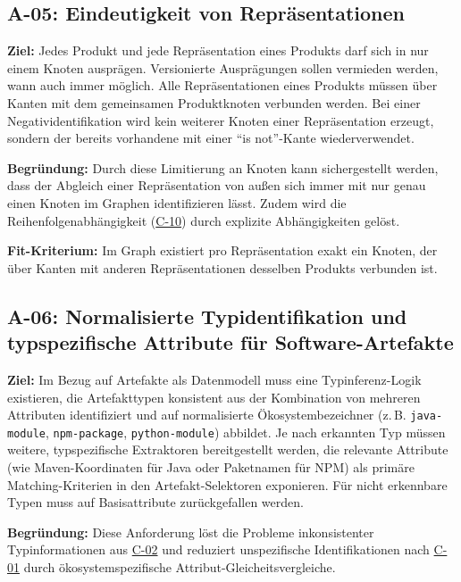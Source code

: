 \subsection{A-05: Eindeutigkeit von Repräsentationen}\label{subsec:req-unique-product-representations}

\textbf{Ziel:}
Jedes Produkt und jede Repräsentation eines Produkts darf sich in nur einem Knoten ausprägen.
Versionierte Ausprägungen sollen vermieden werden, wann auch immer möglich.
Alle Repräsentationen eines Produkts müssen über Kanten mit dem gemeinsamen Produktknoten verbunden werden.
Bei einer Negatividentifikation wird kein weiterer Knoten einer Repräsentation erzeugt, sondern der bereits vorhandene mit einer \enquote{is not}-Kante wiederverwendet.

\textbf{Begründung:}
Durch diese Limitierung an Knoten kann sichergestellt werden, dass der Abgleich einer Repräsentation von außen sich immer mit nur genau einen Knoten im Graphen identifizieren lässt.
Zudem wird die Reihenfolgenabhängigkeit (\hyperref[subsec:c-10-order-dependency]{C-10}) durch explizite Abhängigkeiten gelöst.

\textbf{Fit-Kriterium:}
Im Graph existiert pro Repräsentation exakt ein Knoten, der über Kanten mit anderen Repräsentationen desselben Produkts verbunden ist.

\subsection{A-06: Normalisierte Typidentifikation und typspezifische Attribute für Software-Artefakte}\label{subsec:req-type-specific-matching}

\textbf{Ziel:}
Im Bezug auf Artefakte als Datenmodell muss eine Typinferenz-Logik existieren, die Artefakttypen konsistent aus der Kombination von mehreren Attributen identifiziert und auf normalisierte Ökosystembezeichner (z.\,B. \texttt{java-module}, \texttt{npm-package}, \texttt{python-module}) abbildet.
Je nach erkannten Typ müssen weitere, typspezifische Extraktoren bereitgestellt werden, die relevante Attribute (wie Maven-Koordinaten für Java oder Paketnamen für NPM) als primäre Matching-Kriterien in den Artefakt-Selektoren exponieren.
Für nicht erkennbare Typen muss auf Basisattribute zurückgefallen werden.

\textbf{Begründung:}
Diese Anforderung löst die Probleme inkonsistenter Typinformationen aus \hyperref[subsec:c-02-uneindeutige-artefakt-typinformation]{C-02} und reduziert unspezifische Identifikationen nach \hyperref[subsec:c-01-unspezifische-identifikation-von-artefakten]{C-01} durch ökosystemspezifische Attribut-Gleicheitsvergleiche.

